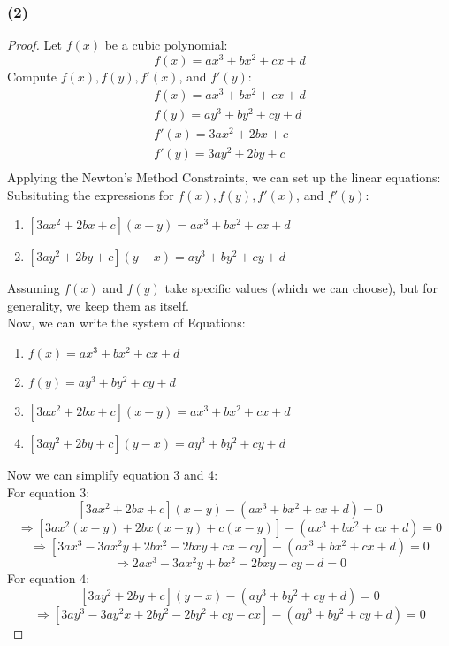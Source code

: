 \documentclass{article}
\begin{document}
\subsubsection*{(2)}
\begin{proof}
    Let $f(x)$ be a cubic polynomial:
    \[ f(x) = ax^3 + bx^2 + cx + d \]
    Compute $f(x), f(y), f'(x)$, and $f'(y)$:
    \[
        \begin{aligned}
            f(x) = ax^3 + bx^2 + cx + d \\
            f(y) = ay^3 + by^2 + cy + d \\
            f'(x) = 3ax^2 + 2bx + c \\
            f'(y) = 3ay^2 + 2by + c \\
        \end{aligned}
    \]
    Applying the Newton's Method Constraints, we can set up the linear equations:
    Subsituting the expressions for $f(x), f(y), f'(x)$, and $f'(y)$:
    \begin{enumerate}
        \item $[3ax^2 + 2bx + c](x - y) = ax^3 + bx^2 + cx + d $
        \item $[3ay^2 + 2by + c](y - x) = ay^3 + by^2 + cy + d $
    \end{enumerate}
    Assuming $f(x)$ and $f(y)$ take specific values (which we can choose), but for generality, we keep them as itself.
    \\
    Now, we can write the system of Equations:
    \begin{enumerate}
        \item $ f(x) = ax^3 + bx^2 + cx + d $
        \item $ f(y) = ay^3 + by^2 + cy + d $
        \item $ [3ax^2 + 2bx + c](x - y) = ax^3 + bx^2 + cx + d $
        \item $[3ay^2 + 2by + c](y - x) = ay^3 + by^2 + cy + d $
    \end{enumerate}
    Now we can simplify equation 3 and 4:
    \\
    For equation $3$:
    \[ [3ax^2 + 2bx + c](x - y) - (ax^3 + bx^2 + cx + d) = 0 \]
    \[ \Rightarrow [3ax^2(x - y) + 2bx(x - y) + c(x - y)] - (ax^3 + bx^2 + cx + d) = 0 \]
    \[ \Rightarrow [3ax^3 - 3ax^2y + 2bx^2 - 2bxy + cx - cy] - (ax^3 + bx^2 + cx + d) = 0 \]
    \[ \Rightarrow 2ax^3 - 3ax^2y + bx^2 - 2bxy - cy - d = 0 \]
    For equation $4$:
    \[ [3ay^2 + 2by + c](y - x) - (ay^3 + by^2 + cy + d) = 0 \]
    \[ \Rightarrow [3ay^3 - 3ay^2x + 2by^2 - 2by^2 + cy - cx] - (ay^3 + by^2 + cy + d) = 0 \]

\end{proof}
\end{document}
